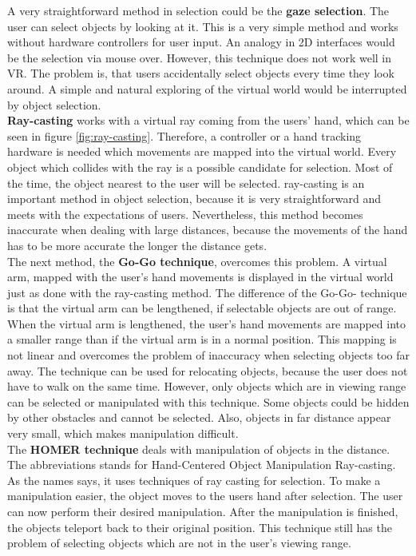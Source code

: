 A very straightforward method in selection could be the \textbf{gaze selection}. The user can select objects by looking at it. This is a very simple method and works without hardware controllers for user input. An analogy in 2D interfaces would be the selection via mouse over. However, this technique does not work well in VR. The problem is, that users accidentally select objects every time they look around. A simple and natural exploring of the virtual world would be interrupted by object selection.\\
\textbf{Ray-casting} works with a virtual ray coming from the users' hand, which can be seen in figure \ref{fig:ray-casting}. Therefore, a controller or a hand tracking hardware is needed which movements are mapped into the virtual world. Every object which collides with the ray is a possible candidate for selection. Most of the time, the object nearest to the user will be selected. ray-casting is an important method in object selection, because it is very straightforward and meets with the expectations of users. Nevertheless, this method becomes inaccurate when dealing with large distances, because the movements of the hand has to be more accurate the longer the distance gets. \\
The next method, the \textbf{Go-Go technique}, overcomes this problem. A virtual arm, mapped with the user's hand movements is displayed in the virtual world just as done with the ray-casting method. The difference of the Go-Go- technique is that the virtual arm can be lengthened, if selectable objects are out of range. When the virtual arm is lengthened, the user's hand movements are mapped into a smaller range than if the virtual arm is in a normal position. This mapping is not linear and overcomes the problem of inaccuracy when selecting objects too far away. The technique can be used for relocating objects, because the user does not have to walk on the same time. However, only objects which are in viewing range can be selected or manipulated with this technique. Some objects could be hidden by other obstacles and cannot be selected. Also, objects in far distance appear very small, which makes manipulation difficult.\\
The \textbf{HOMER technique} deals with manipulation of objects in the distance. The abbreviations stands for Hand-Centered Object Manipulation Ray-casting. As the names says, it uses techniques of ray casting for selection. To make a manipulation easier, the object moves to the users hand after selection. The user can now perform their desired manipulation. After the manipulation is finished, the objects teleport back to their original position. This technique still has the problem of selecting objects which are not in the user's viewing range.\\
